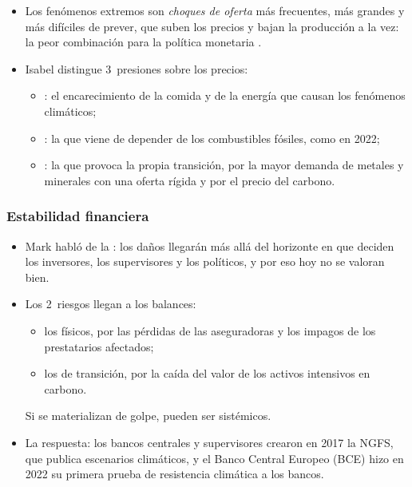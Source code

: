 \documentclass[11pt]{article}
\begin{document}
\begin{itemize}
\item Los fenómenos extremos son \emph{choques de oferta} más frecuentes, más grandes y más difíciles de prever, que suben los precios y bajan la producción a la vez: la peor combinación para la política monetaria .
\item Isabel \textcite{Schnabel2022New} distingue 3~presiones sobre los precios:
  \begin{itemize}
  \item {}: el encarecimiento de la comida y de la energía que causan los fenómenos climáticos;
  \item {}: la que viene de depender de los combustibles fósiles, como en 2022\nocite{Schnabel2022New};
  \item {}: la que provoca la propia transición, por la mayor demanda de metales y minerales con una oferta rígida y por el precio del carbono.
  \end{itemize}
\end{itemize}

\subsubsection{Estabilidad financiera}\label{sec:canal-financiero}

\begin{itemize}
\item Mark \textcite{Carney2015Breaking} habló de la : los daños llegarán más allá del horizonte en que deciden los inversores, los supervisores y los políticos, y por eso hoy no se valoran bien.
\item Los 2~riesgos llegan a los balances:
  \begin{itemize}
  \item los físicos, por las pérdidas de las aseguradoras y los impagos de los prestatarios afectados;
  \item los de transición, por la caída del valor de los activos intensivos en carbono.
  \end{itemize}
  Si se materializan de golpe, pueden ser sistémicos.
\item La respuesta: los bancos centrales y supervisores crearon en 2017 la NGFS, que publica escenarios climáticos, y el Banco Central Europeo (BCE) hizo en 2022 su primera prueba de resistencia climática a los bancos\nocite{BCE2022Stress}.
\end{itemize}
\end{document}
